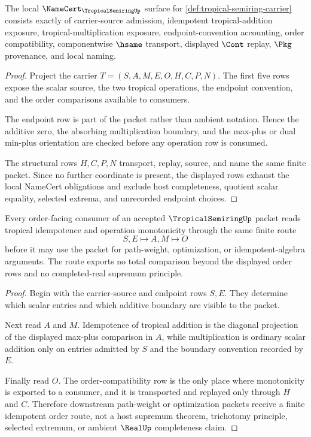 \begin{theorem}
\label{thm:tropical-semiring-namecert-obligations}
The local $\NameCert_{\TropicalSemiringUp}$ surface for \autoref{def:tropical-semiring-carrier} consists exactly of carrier-source admission, idempotent tropical-addition exposure, tropical-multiplication exposure, endpoint-convention accounting, order compatibility, componentwise $\hsame$ transport, displayed $\Cont$ replay, $\Pkg$ provenance, and local naming.
\end{theorem}
\begin{proof}
Project the carrier $T=(S,A,M,E,O,H,C,P,N)$. The first five rows expose the scalar source, the two tropical operations, the endpoint convention, and the order comparisons available to consumers.

The endpoint row is part of the packet rather than ambient notation. Hence the additive zero, the absorbing multiplication boundary, and the max-plus or dual min-plus orientation are checked before any operation row is consumed.

The structural rows $H,C,P,N$ transport, replay, source, and name the same finite packet. Since no further coordinate is present, the displayed rows exhaust the local NameCert obligations and exclude host completeness, quotient scalar equality, selected extrema, and unrecorded endpoint choices.
\end{proof}

\begin{theorem}
\label{thm:tropical-semiring-idempotent-order-route}
Every order-facing consumer of an accepted $\TropicalSemiringUp$ packet reads tropical idempotence and operation monotonicity through the same finite route
$$
S,E \longmapsto A,M \longmapsto O
$$
before it may use the packet for path-weight, optimization, or idempotent-algebra arguments. The route exports no total comparison beyond the displayed order rows and no completed-real supremum principle.
\end{theorem}
\begin{proof}
Begin with the carrier-source and endpoint rows $S,E$. They determine which scalar entries and which additive boundary are visible to the packet.

Next read $A$ and $M$. Idempotence of tropical addition is the diagonal projection of the displayed max-plus comparison in $A$, while multiplication is ordinary scalar addition only on entries admitted by $S$ and the boundary convention recorded by $E$.

Finally read $O$. The order-compatibility row is the only place where monotonicity is exported to a consumer, and it is transported and replayed only through $H$ and $C$. Therefore downstream path-weight or optimization packets receive a finite idempotent order route, not a host supremum theorem, trichotomy principle, selected extremum, or ambient $\RealUp$ completeness claim.
\end{proof}

